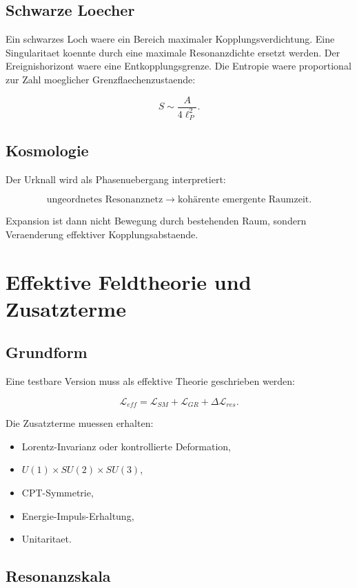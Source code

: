 \documentclass[11pt,a4paper]{article}
\begin{document}
\subsection{Schwarze Loecher}

Ein schwarzes Loch waere ein Bereich maximaler Kopplungsverdichtung. Eine Singularitaet koennte durch eine maximale
Resonanzdichte ersetzt werden. Der Ereignishorizont waere eine Entkopplungsgrenze. Die Entropie waere proportional
zur Zahl moeglicher Grenzflaechenzustaende:

\[
S\sim\frac{A}{4\ell_P^2}.
\]

\subsection{Kosmologie}

Der Urknall wird als Phasenuebergang interpretiert:

\[
\text{ungeordnetes Resonanznetz}
\rightarrow
\text{kohärente emergente Raumzeit}.
\]

Expansion ist dann nicht Bewegung durch bestehenden Raum, sondern Veraenderung effektiver Kopplungsabstaende.

\section{Effektive Feldtheorie und Zusatzterme}

\subsection{Grundform}

Eine testbare Version muss als effektive Theorie geschrieben werden:

\[
\mathcal{L}_{eff}
=
\mathcal{L}_{SM}
+
\mathcal{L}_{GR}
+
\Delta\mathcal{L}_{res}.
\]

Die Zusatzterme muessen erhalten:
\begin{itemize}
  \item Lorentz-Invarianz oder kontrollierte Deformation,
  \item $U(1)\times SU(2)\times SU(3)$,
  \item CPT-Symmetrie,
  \item Energie-Impuls-Erhaltung,
  \item Unitaritaet.
\end{itemize}

\subsection{Resonanzskala}
\end{document}
